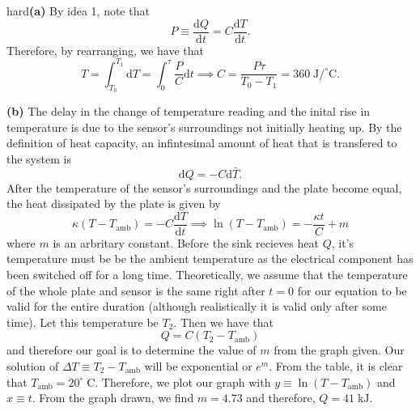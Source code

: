 \begin{solution}{hard}\textbf{(a)} By idea 1, note that 
\[P \equiv \frac{\text{d}Q}{\text{d}t} = C\frac{\text{d}T}{\text{d}t}.\]
Therefore, by rearranging, we have that 
\[T = \int_{T_0}^{T_1} \text{d}T = \int_{0}^{\tau} \frac{P}{C} \text{d}t\implies C = \frac{P\tau}{T_0 - T_1} = 360\;\mathrm{J/^{\circ}C}.\]
\vspace{3mm}

\noindent \textbf{(b)} The delay in the change of temperature reading and the inital rise in temperature is due to the sensor's surroundings not initially heating up. By the definition of heat capacity, an infintesimal amount of heat that is transfered to the system is 
\[\text{d}Q = -C\text{d}\bar{T}.\]
After the temperature of the sensor's surroundings and the plate become equal, the heat dissipated by the plate is given by 
\[\kappa (T - T_{\text{amb}}) = -C \frac{\text{d}T}{\text{d}t}\implies \ln (T - T_{\text{amb}}) = -\frac{\kappa t}{C} + m\]
where $m$ is an arbritary constant. Before the sink recieves heat $Q$, it's temperature must be be the ambient temperature as the electrical component has been switched off for a long time. Theoretically, we assume that the temperature of the whole plate and sensor is the same right after $t = 0$ for our equation to be valid for the entire duration (although realistically it is valid only after some time). Let this temperature be $T_2$.  Then we have that 
\[Q = C (T_2 - T_{\text{amb}})\]
and therefore our goal is to determine the value of $m$ from the graph given. Our solution of $\Delta T \equiv T_2 - T_{\text{amb}}$ will be exponential or $e^m$. From the table, it is clear that $T_{\text{amb}} = 20^{\circ}\;\mathrm{C}$. Therefore, we plot our graph with $y \equiv \ln (T - T_{\text{amb}})$ and $x \equiv t$. From the graph drawn, we find $m = 4.73$ and therefore, $Q = 41\;\mathrm{kJ}$.
\end{solution}